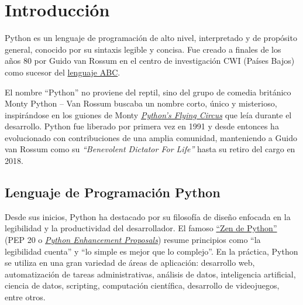 \pagestyle{fi-page}
\chapter{Introducción}

Python es un lenguaje de programación de alto nivel, interpretado y de propósito general, conocido por su sintaxis legible y concisa.
Fue creado a finales de los años 80 por Guido van Rossum en el centro de investigación CWI (Países Bajos) como sucesor del 
\href{https://docs.python.org/3/license.html}{lenguaje ABC}. 

El nombre “Python” no proviene del reptil, sino del grupo de comedia británico Monty Python – Van Rossum buscaba un nombre corto, 
único y misterioso, inspirándose en los guiones de Monty \href{https://docs.python.org/3/faq/general.html}{\textit{Python’s Flying Circus}} 
que leía durante el desarrollo. Python fue liberado por primera vez en 1991 y desde entonces ha evolucionado con contribuciones de una amplia 
comunidad, manteniendo a Guido van Rossum como su \textit{“Benevolent Dictator For Life”} hasta su retiro del cargo en 2018.

\section{Lenguaje de Programación Python}
Desde sus inicios, Python ha destacado por su filosofía de diseño enfocada en la legibilidad y la productividad del desarrollador. 
El famoso \href{https://peps.python.org/pep-0020/}{“Zen de Python”} (PEP 20 o \href{https://peps.python.org/pep-0000/}{\textit{Python Enhancement Proposals}}) resume principios como “la legibilidad cuenta” y “lo simple es mejor que lo complejo”. 
En la práctica, Python se utiliza en una gran variedad de áreas de aplicación: desarrollo web, automatización de tareas administrativas, 
análisis de datos, inteligencia artificial, ciencia de datos, scripting, computación científica, desarrollo de videojuegos, entre otros.


